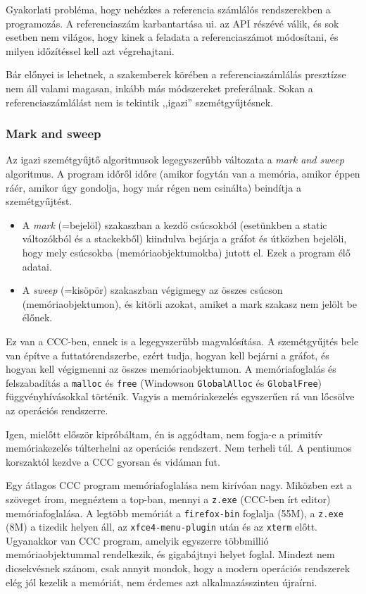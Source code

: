 Gyakorlati probléma, hogy nehézkes a referencia számlálós rendszerekben
a programozás. A referenciaszám karbantartása ui. az API részévé válik,
és sok esetben nem világos, hogy kinek a feladata a  referenciaszámot módosítani,
és milyen időzítéssel kell azt végrehajtani.

Bár előnyei is lehetnek, 
a szakemberek körében a referenciaszámlálás presztízse nem áll valami magasan,
inkább más módszereket preferálnak. Sokan a referenciaszámlálást nem is tekintik
,,igazi'' szemétgyűjtésnek.


\subsubsection{Mark and sweep}

Az igazi szemétgyűjtő algoritmusok legegyszerűbb változata a
{\em mark and sweep\/} algoritmus. A program időről időre (amikor fogytán van
a memória, amikor éppen ráér, amikor úgy gondolja, hogy már régen
nem csinálta) beindítja a szemétgyűjtést.

\begin{itemize}
\item A {\em mark\/} (=bejelöl) szakaszban a kezdő csúcsokból
    (esetünkben a static változókból és a stackekből) kiindulva bejárja
    a gráfot és útközben bejelöli, hogy mely csúcsokba (memóriaobjektumokba)
    jutott el. Ezek a program élő adatai.
\item A {\em sweep\/} (=kisöpör) szakaszban végigmegy az összes csúcson
    (memóriaobjektumon), és kitörli azokat, amiket a mark szakasz nem jelölt
    be élőnek.
\end{itemize}


Ez van a CCC-ben, ennek is a legegyszerűbb magvalósítása. 
A szemétgyűjtés bele van építve a futtatórendszerbe, 
ezért tudja, hogyan kell bejárni a gráfot,
és hogyan kell végigmenni az összes memóriaobjektumon.
A memóriafoglalás és felszabadítás a \verb!malloc! és 
\verb!free! (Windowson \verb!GlobalAlloc! és \verb!GlobalFree!)
függvényhívásokkal történik. Vagyis a memóriakezelés egyszerűen 
rá van lőcsölve az operációs rendszerre.

Igen, mielőtt először kipróbáltam, én is aggódtam, nem fogja-e a primitív
memóriakezelés túlterhelni az operációs rendszert. Nem terheli túl.
A pentiumos korszaktól kezdve a CCC gyorsan és vidáman fut.

Egy átlagos CCC program memóriafoglalása nem kirívóan nagy. 
Miközben ezt a szöveget írom, megnéztem a top-ban, mennyi a \verb!z.exe!
(CCC-ben írt editor) memóriafoglalása. A legtöbb memóriát a \verb!firefox-bin!
foglalja (55M), a \verb!z.exe! (8M) a tizedik helyen áll, 
az \verb!xfce4-menu-plugin! után és az \verb!xterm! előtt.
Ugyanakkor van CCC program, amelyik egyszerre többmillió memóriaobjektummal
rendelkezik, és gigabájtnyi helyet foglal. Mindezt nem dicsekvésnek szánom,
csak annyit mondok, hogy a modern operációs rendszerek
elég jól kezelik a memóriát, nem érdemes azt alkalmazásszinten újraírni.


